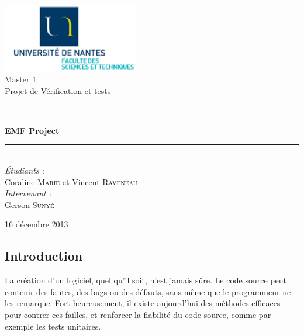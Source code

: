 \documentclass[a4paper]{article}
\newcommand{\HRule}{\rule{\linewidth}{0.5mm}}
\begin{document}
	\begin{titlepage}
		\begin{center}

			\includegraphics[width=0.45\textwidth]{UN-sciences.png}~\\[2cm]

			\LARGE{Master 1 }\\[1.5cm]

			\Large{Projet de Vérification et tests}\\[0.5cm]

			\HRule \\[0.4cm]
			{ \huge \bfseries EMF Project \\[0.4cm] }
			\HRule \\[1.5cm]

			\normalsize		
			\emph{\'Etudiants :}\\
			Coraline \textsc{Marie} et Vincent \textsc{Raveneau}\\
			\vspace{0.5cm}
			\emph{Intervenant :} \\
			Gerson \textsc{Sunyé}
		
			\vfill

			{\large 16 décembre 2013}

		\end{center}
	\end{titlepage}


	\renewcommand{\contentsname}{Sommaire}
	\tableofcontents
	\newpage


	\begin{center}
		\section{Introduction}
	\end{center}

	\vspace{0.5cm}

	La création d'un logiciel, quel qu'il soit, n'est jamais sûre. Le code source peut contenir des fautes, des bugs ou des défauts, sans même que le programmeur ne les remarque. Fort heureusement, il existe aujourd'hui des méthodes efficaces pour contrer ces failles, et renforcer la fiabilité du code source, comme par exemple les tests unitaires.
\end{document}
